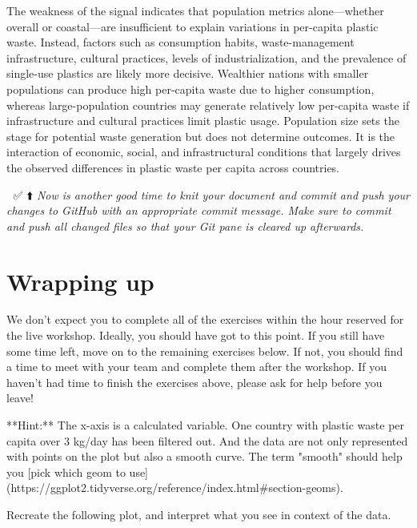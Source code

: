 \documentclass[
]{article}
\newenvironment{Shaded}{\begin{snugshade}}{\end{snugshade}}
\newcommand{\NormalTok}[1]{#1}
\begin{document}
The weakness of the signal indicates that population metrics
alone---whether overall or coastal---are insufficient to explain
variations in per-capita plastic waste. Instead, factors such as
consumption habits, waste-management infrastructure, cultural practices,
levels of industrialization, and the prevalence of single-use plastics
are likely more decisive. Wealthier nations with smaller populations can
produce high per-capita waste due to higher consumption, whereas
large-population countries may generate relatively low per-capita waste
if infrastructure and cultural practices limit plastic usage. Population
size sets the stage for potential waste generation but does not
determine outcomes. It is the interaction of economic, social, and
infrastructural conditions that largely drives the observed differences
in plastic waste per capita across countries.

🧶 ✅ ⬆️ \emph{Now is another good time to knit your document and commit
and push your changes to GitHub with an appropriate commit message. Make
sure to commit and push all changed files so that your Git pane is
cleared up afterwards.}

\section{Wrapping up}\label{wrapping-up}

We don't expect you to complete all of the exercises within the hour
reserved for the live workshop. Ideally, you should have got to this
point. If you still have some time left, move on to the remaining
exercises below. If not, you should find a time to meet with your team
and complete them after the workshop. If you haven't had time to finish
the exercises above, please ask for help before you leave!

\begin{Shaded}
\begin{Highlighting}[]
\NormalTok{**Hint:** The x{-}axis is a calculated variable. One country with plastic waste per capita over 3 kg/day has been filtered out. And the data are not only represented with points on the plot but also a smooth curve. The term "smooth" should help you [pick which geom to use](https://ggplot2.tidyverse.org/reference/index.html\#section{-}geoms).}
\end{Highlighting}
\end{Shaded}

Recreate the following plot, and interpret what you see in context of
the data.
\end{document}

